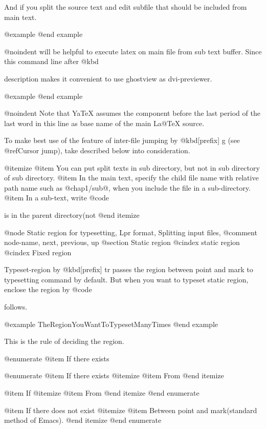 {{  And if you split the source text and
edit subfile that should be included from main text.

@example
@end example

@noindent
will be helpful to execute latex on main file from sub text buffer.  Since
this command line after @kbd{%
description makes it convenient to use ghostview as dvi-previewer.

@example
@end example

@noindent
Note that YaTeX  assumes the component  before the  last period of
the last word in this line as base name of the main La@TeX{} source.

  To make best use of the feature of inter-file jumping by
@kbd{[prefix] g} (see @ref{Cursor jump}), take described below into
consideration.

@itemize
@item You can put split texts in sub directory, but not in
 sub directory of sub directory.
@item In the main text, specify the child file name with relative path name
 such as @{chap1/sub@}, when you include the file in
 a sub-directory.
@item In a sub-text, write @code{%
 is in the parent directory(not %
@end itemize

@node Static region for typesetting, Lpr format, Splitting input files, %
@comment  node-name,  next,  previous,  up
@section Static region
@cindex static region
@cindex Fixed region

  Typeset-region by @kbd{[prefix] tr} passes the region between point and
mark to typesetting command by default.  But when you want to typeset
static region, enclose the region by @code{%
follows.

@example
          TheRegionYouWantToTypesetManyTimes
@end example

This is the rule of deciding the region.

@enumerate
@item
If there exists %

@enumerate
@item
If there exists %
@itemize
@item From %
@end itemize

@item
If %
@itemize
@item From %
@end itemize
@end enumerate

@item
If there does not exist %
@itemize
@item Between point and mark(standard method of Emacs).
@end itemize
@end enumerate

}}}}}
